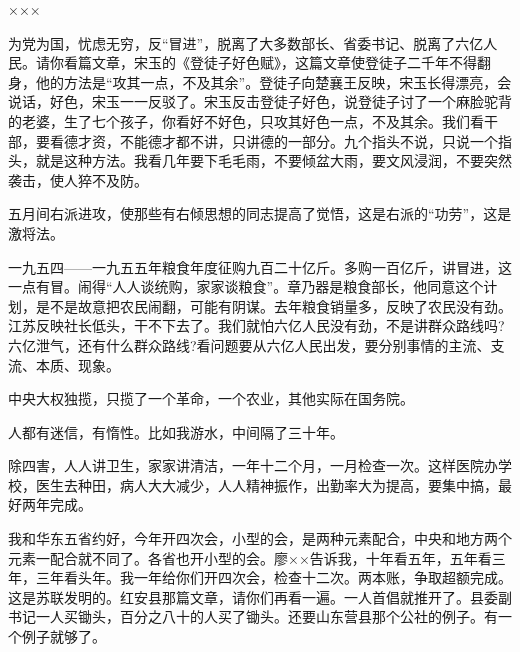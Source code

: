 ×××

为党为国，忧虑无穷，反“冒进”，脱离了大多数部长、省委书记、脱离了六亿人民。请你看篇文章，宋玉的《登徒子好色赋》，这篇文章使登徒子二千年不得翻身，他的方法是“攻其一点，不及其余”。登徒子向楚襄王反映，宋玉长得漂亮，会说话，好色，宋玉一一反驳了。宋玉反击登徒子好色，说登徒子讨了一个麻脸驼背的老婆，生了七个孩子，你看好不好色，只攻其好色一点，不及其余。我们看干部，要看德才资，不能德才都不讲，只讲德的一部分。九个指头不说，只说一个指头，就是这种方法。我看几年要下毛毛雨，不要倾盆大雨，要文风浸润，不要突然袭击，使人猝不及防。

五月间右派进攻，使那些有右倾思想的同志提高了觉悟，这是右派的“功劳”，这是激将法。

一九五四——一九五五年粮食年度征购九百二十亿斤。多购一百亿斤，讲冒进，这一点有冒。闹得“人人谈统购，家家谈粮食”。章乃器是粮食部长，他同意这个计划，是不是故意把农民闹翻，可能有阴谋。去年粮食销量多，反映了农民没有劲。江苏反映社长低头，干不下去了。我们就怕六亿人民没有劲，不是讲群众路线吗?六亿泄气，还有什么群众路线?看问题要从六亿人民出发，要分别事情的主流、支流、本质、现象。

中央大权独揽，只揽了一个革命，一个农业，其他实际在国务院。

人都有迷信，有惰性。比如我游水，中间隔了三十年。

除四害，人人讲卫生，家家讲清洁，一年十二个月，一月检查一次。这样医院办学校，医生去种田，病人大大减少，人人精神振作，出勤率大为提高，要集中搞，最好两年完成。

我和华东五省约好，今年开四次会，小型的会，是两种元素配合，中央和地方两个元素一配合就不同了。各省也开小型的会。廖××告诉我，十年看五年，五年看三年，三年看头年。我一年给你们开四次会，检查十二次。两本账，争取超额完成。这是苏联发明的。红安县那篇文章，请你们再看一遍。一人首倡就推开了。县委副书记一人买锄头，百分之八十的人买了锄头。还要山东营县那个公社的例子。有一个例子就够了。

